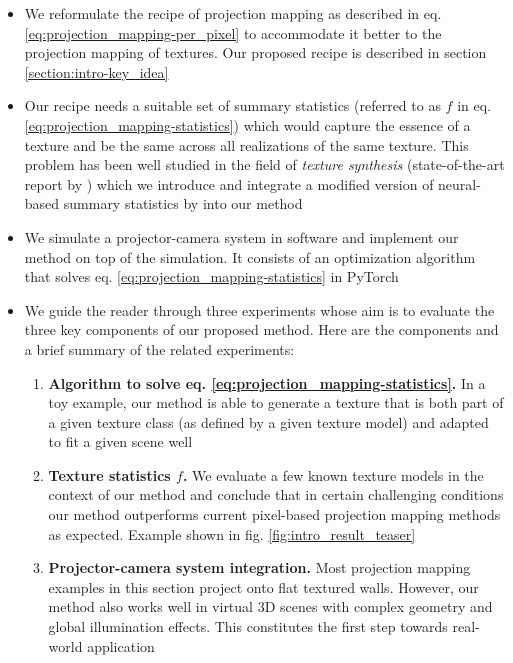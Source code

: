 \begin{itemize}
    \item We reformulate the recipe of projection mapping as described in eq. \ref{eq:projection_mapping-per_pixel} to accommodate it better to the projection mapping of textures. Our proposed recipe is described in section \ref{section:intro-key_idea}
    \item Our recipe needs a suitable set of summary statistics (referred to as \(f\) in eq. \ref{eq:projection_mapping-statistics}) which would capture the essence of a texture and be the same across all realizations of the same texture. This problem has been well studied in the field of \textit{texture synthesis} (state-of-the-art report by \citet{Raad2018}) which we introduce and integrate a modified version of neural-based summary statistics by \citet{Gatys2015} into our method
    \item We simulate a projector-camera system in software and implement our method on top of the simulation. It consists of an optimization algorithm that solves eq. \ref{eq:projection_mapping-statistics} in PyTorch
    \item We guide the reader through three experiments whose aim is to evaluate the three key components of our proposed method. Here are the components and a brief summary of the related experiments:
    \begin{enumerate}
        \item \textbf{Algorithm to solve eq. \ref{eq:projection_mapping-statistics}.} In a toy example, our method is able to generate a texture that is both part of a given texture class (as defined by a given texture model) and adapted to fit a given scene well
        \item \textbf{Texture statistics \(f\).} We evaluate a few known texture models in the context of our method and conclude that in certain challenging conditions our method outperforms current pixel-based projection mapping methods as expected. Example shown in fig. \ref{fig:intro_result_teaser}
        \item \textbf{Projector-camera system integration.} Most projection mapping examples in this section project onto flat textured walls. However, our method also works well in virtual 3D scenes with complex geometry and global illumination effects. This constitutes the first step towards real-world application
    \end{enumerate}
\end{itemize}

